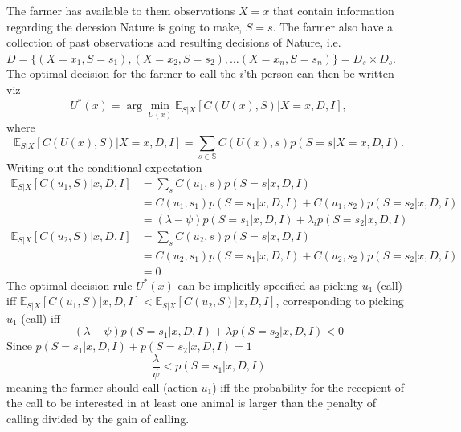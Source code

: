 \documentclass[a4paper,11pt, oneside]{article}
\theoremstyle{definition}
\begin{document}
	The farmer has available to them observations $X=x$ that contain information regarding the decesion Nature is going to make, $S=s$. The farmer also have a collection of past observations and resulting decisions of Nature, i.e. $D= \{(X=x_1,S=s_1),(X=x_2,S=s_2),\dots (X=x_n,S=s_n)\}= D_s\times D_s$. The optimal decision for the farmer to call the $i$'th person can then be written viz
	\begin{equation}
		U^*(x) = \arg\min_{U(x)} \mathbb{E}_{S|X}[C(U(x), S)|X=x,D,I],
	\end{equation}
	where
	\begin{equation}
		\mathbb{E}_{S|X}[C(U(x), S)|X=x,D,I] = \sum_{s\in \mathbb{S}} C(U(x),s) p(S=s|X=x,D,I).
	\end{equation}
	Writing out the conditional expectation
	\begin{equation}
		\begin{split}
			\mathbb{E}_{S|X}[C(u_1, S)|x,D,I] & = \sum_sC(u_1,s)p(S=s|x,D,I)\\
			& = C(u_1,s_1)p(S= s_1|x,D,I) + C(u_1,s_2)p(S= s_2|x,D,I)\\
			& = (\lambda-\psi)p(S= s_1|x,D,I) + \lambda_i p(S= s_2|x,D,I)\\
			\mathbb{E}_{S|X}[C(u_2, S)|x,D,I] & = \sum_sC(u_2,s)p(S=s|x,D,I)\\
			& = C(u_2,s_1)p(S= s_1|x,D,I) + C(u_2,s_2)p(S= s_2|x,D,I)\\
			&=0
		\end{split}
	\end{equation}
	The optimal decision rule $U^*(x)$ can be implicitly specified as picking $u_1$ (call) iff $\mathbb{E}_{S|X}[C(u_1, S)|x,D,I]<\mathbb{E}_{S|X}[C(u_2, S)|x,D,I]$, corresponding to picking $u_1$ (call) iff
	\begin{equation}
		(\lambda-\psi)p(S= s_1|x,D,I) + \lambda p(S= s_2|x,D,I) <0
	\end{equation}
	Since $p(S= s_1|x,D,I) +p(S= s_2|x,D,I) = 1$
	\begin{equation}
			\frac{\lambda}{\psi} < p(S= s_1|x,D,I)
			\label{eq:decision_rule}
	\end{equation}
	meaning the farmer should call (action $u_1$) iff the probability for the recepient of the call to be interested in at least one animal is larger than the penalty of calling divided by the gain of calling. 
	
\end{document}
